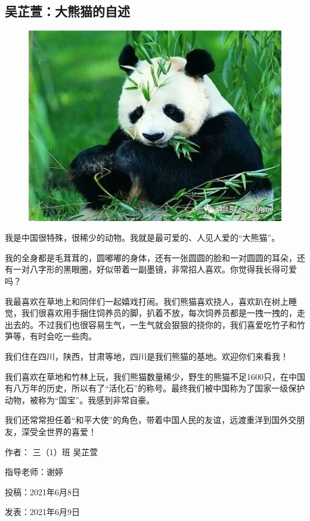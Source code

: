 \vspace{10pt}

{\centering\subsection*{吴芷萱：大熊猫的自述}}


\renewcommand{\leftmark}{吴芷萱：大熊猫的自述}

\begin{figure}[htbp]

\centering

\includegraphics[width = .5\textwidth]{./ch/7.jpg}

\end{figure}



我是中国很特殊，很稀少的动物。我就是最可爱的、人见人爱的“大熊猫”。

我的全身都是毛茸茸的，圆嘟嘟的身体，还有一张圆圆的脸和一对圆圆的耳朵，还有一对八字形的黑眼圈，好似带着一副墨镜，非常招人喜欢。你觉得我长得可爱吗？

我最喜欢在草地上和同伴们一起嬉戏打闹。我们熊猫喜欢挠人，喜欢趴在树上睡觉，我们很喜欢用手捆住饲养员的脚，扒着不放，每次饲养员都是一拽一拽的，走出去的。不过我们也很容易生气，一生气就会狠狠的挠你的，我们喜爱吃竹子和竹笋等，有时会吃一些肉。

我们住在四川，陕西，甘肃等地，四川是我们熊猫的基地。欢迎你们来看我！

我们喜欢在草地和竹林上玩，我们熊猫数量稀少，野生的熊猫不足1600只，在中国有八万年的历史，所以有了“活化石”的称号。最终我们被中国称为了国家一级保护动物，被称为“国宝”。我感到非常自豪。

我们还常常担任着“和平大使”的角色，带着中国人民的友谊，远渡重洋到国外交朋友，深受全世界的喜爱！





\vspace{10pt}



作者： 三（1）班 吴芷萱



指导老师：谢婷



投稿：2021年6月8日



发表：2021年6月9日






                



\vspace{10pt}

\hline



